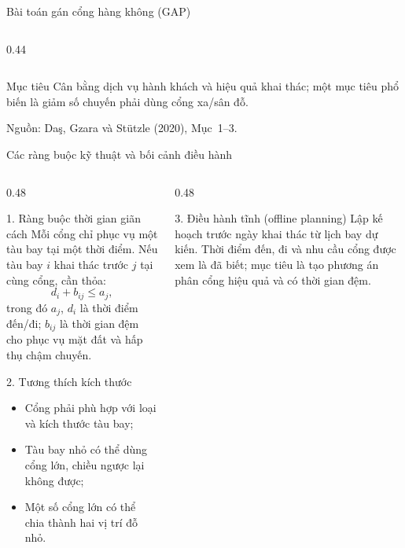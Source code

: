 \documentclass[aspectratio=169,10pt]{beamer}
\begin{document}
\begin{frame}[t]{Bài toán gán cổng hàng không (GAP)}
\begin{columns}[T,onlytextwidth]
\begin{column}{0.44\textwidth}
\end{column}
\end{columns}

\vspace{-2.0ex}
\begin{block}{Mục tiêu}
Cân bằng dịch vụ hành khách và hiệu quả khai thác; một mục tiêu phổ biến
là giảm số chuyến phải dùng cổng xa/sân đỗ.
\end{block}

\vfill
\tiny Nguồn: Da\c{s}, Gzara và St\"utzle (2020), Mục~1--3.

\end{frame}

\begin{frame}[t]{Các ràng buộc kỹ thuật và bối cảnh điều hành}

\footnotesize
\begin{columns}[T,onlytextwidth]
\begin{column}{0.48\textwidth}

\begin{block}{1. Ràng buộc thời gian giãn cách}
Mỗi cổng chỉ phục vụ một tàu bay tại một thời điểm. Nếu tàu bay $i$
khai thác trước $j$ tại cùng cổng, cần thỏa:
\[
    d_i + b_{ij} \leq a_j,
\]
trong đó $a_j$, $d_i$ là thời điểm đến/đi; $b_{ij}$ là thời gian đệm
cho phục vụ mặt đất và hấp thụ chậm chuyến.
\end{block}

\begin{alertblock}{2. Tương thích kích thước}
\begin{itemize}
    \setlength{\itemsep}{2pt}
    \item Cổng phải phù hợp với loại và kích thước tàu bay;
    \item Tàu bay nhỏ có thể dùng cổng lớn, chiều ngược lại không được;
    \item Một số cổng lớn có thể chia thành hai vị trí đỗ nhỏ.
\end{itemize}
\end{alertblock}

\end{column}
\begin{column}{0.48\textwidth}

\begin{block}{3. Điều hành tĩnh (offline planning)}
Lập kế hoạch trước ngày khai thác từ lịch bay dự kiến. Thời điểm đến,
đi và nhu cầu cổng được xem là đã biết; mục tiêu là tạo phương án
phân cổng hiệu quả và có thời gian đệm.
\end{block}


\end{column}
\end{columns}
\end{frame}
\end{document}
